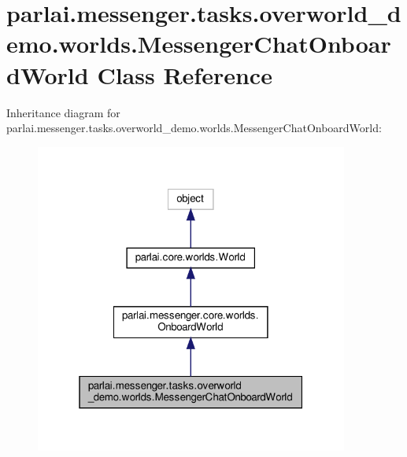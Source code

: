 \hypertarget{classparlai_1_1messenger_1_1tasks_1_1overworld__demo_1_1worlds_1_1MessengerChatOnboardWorld}{}\section{parlai.\+messenger.\+tasks.\+overworld\+\_\+demo.\+worlds.\+Messenger\+Chat\+Onboard\+World Class Reference}
\label{classparlai_1_1messenger_1_1tasks_1_1overworld__demo_1_1worlds_1_1MessengerChatOnboardWorld}


Inheritance diagram for parlai.\+messenger.\+tasks.\+overworld\+\_\+demo.\+worlds.\+Messenger\+Chat\+Onboard\+World\+:
\nopagebreak
\begin{figure}[H]
\begin{center}
\leavevmode
\includegraphics[width=292pt]{classparlai_1_1messenger_1_1tasks_1_1overworld__demo_1_1worlds_1_1MessengerChatOnboardWorld__inherit__graph}
\end{center}
\end{figure}


